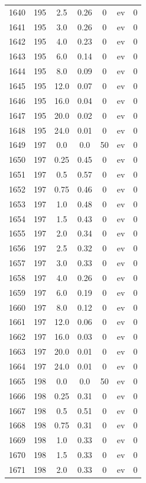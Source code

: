 \documentclass[12pt,a4paper]{article}
\begin{document}
\begin{tabular}{r|cccccc}
	1640 & 195 & 2.5 & 0.26 & 0 & ev & 0 \\
	1641 & 195 & 3.0 & 0.26 & 0 & ev & 0 \\
	1642 & 195 & 4.0 & 0.23 & 0 & ev & 0 \\
	1643 & 195 & 6.0 & 0.14 & 0 & ev & 0 \\
	1644 & 195 & 8.0 & 0.09 & 0 & ev & 0 \\
	1645 & 195 & 12.0 & 0.07 & 0 & ev & 0 \\
	1646 & 195 & 16.0 & 0.04 & 0 & ev & 0 \\
	1647 & 195 & 20.0 & 0.02 & 0 & ev & 0 \\
	1648 & 195 & 24.0 & 0.01 & 0 & ev & 0 \\
	1649 & 197 & 0.0 & 0.0 & 50 & ev & 0 \\
	1650 & 197 & 0.25 & 0.45 & 0 & ev & 0 \\
	1651 & 197 & 0.5 & 0.57 & 0 & ev & 0 \\
	1652 & 197 & 0.75 & 0.46 & 0 & ev & 0 \\
	1653 & 197 & 1.0 & 0.48 & 0 & ev & 0 \\
	1654 & 197 & 1.5 & 0.43 & 0 & ev & 0 \\
	1655 & 197 & 2.0 & 0.34 & 0 & ev & 0 \\
	1656 & 197 & 2.5 & 0.32 & 0 & ev & 0 \\
	1657 & 197 & 3.0 & 0.33 & 0 & ev & 0 \\
	1658 & 197 & 4.0 & 0.26 & 0 & ev & 0 \\
	1659 & 197 & 6.0 & 0.19 & 0 & ev & 0 \\
	1660 & 197 & 8.0 & 0.12 & 0 & ev & 0 \\
	1661 & 197 & 12.0 & 0.06 & 0 & ev & 0 \\
	1662 & 197 & 16.0 & 0.03 & 0 & ev & 0 \\
	1663 & 197 & 20.0 & 0.01 & 0 & ev & 0 \\
	1664 & 197 & 24.0 & 0.01 & 0 & ev & 0 \\
	1665 & 198 & 0.0 & 0.0 & 50 & ev & 0 \\
	1666 & 198 & 0.25 & 0.31 & 0 & ev & 0 \\
	1667 & 198 & 0.5 & 0.51 & 0 & ev & 0 \\
	1668 & 198 & 0.75 & 0.31 & 0 & ev & 0 \\
	1669 & 198 & 1.0 & 0.33 & 0 & ev & 0 \\
	1670 & 198 & 1.5 & 0.33 & 0 & ev & 0 \\
	1671 & 198 & 2.0 & 0.33 & 0 & ev & 0 \\

\end{tabular}
\end{document}
